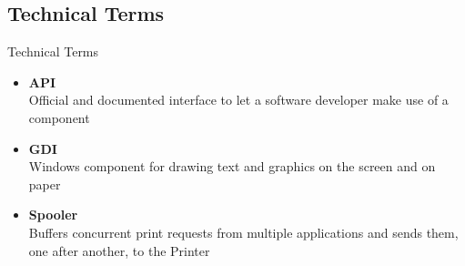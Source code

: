 \documentclass[aspectratio=1610]{beamer}
\begin{document}
\subsection{Technical Terms}
\begin{frame}{Technical Terms}
	\begin{itemize}
		\item \textbf{API} \\
					Official and documented interface to let a software developer make use of a component
					\bigskip
					
		\item \textbf{GDI} \\
					Windows component for drawing text and graphics on the screen and on paper
					\bigskip
					
		\item \textbf{Spooler} \\
					Buffers concurrent print requests from multiple applications and sends them,\\
					one after another, to the Printer
					\bigskip
	\end{itemize}
\end{frame}
\end{document}
